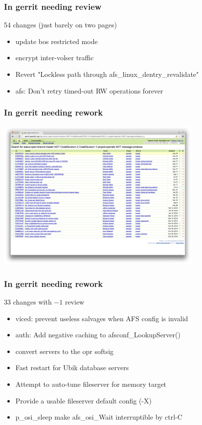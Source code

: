 \documentclass{beamer}
\begin{document}
\begin{frame}
\frametitle{In gerrit needing review}
54 changes (just barely on two pages)
\begin{itemize}
\item{update bos restricted mode}
\item{encrypt inter-volser traffic}
\item{Revert "Lockless path through afs\_linux\_dentry\_revalidate"}
\item{afs: Don't retry timed-out RW operations forever}
\end{itemize}
\end{frame}

\begin{frame}
\frametitle{In gerrit needing rework}
\includegraphics[width=4in]{gerrit-minusone}
\end{frame}

\begin{frame}
\frametitle{In gerrit needing rework}
33 changes with $-1$ review
\begin{itemize}
\item{viced: prevent useless salvages when AFS config is invalid}
\item{auth: Add negative caching to afsconf\_LookupServer()}
\item{convert servers to the opr softsig}
\item{Fast restart for Ubik database servers}
\pause
\item{Attempt to auto-tune fileserver for memory target}
\item{Provide a usable fileserver default config (-X)}
\pause
\item{p\_osi\_sleep make afs\_osi\_Wait interruptible by ctrl-C}
\end{itemize}
\end{frame}
\end{document}
